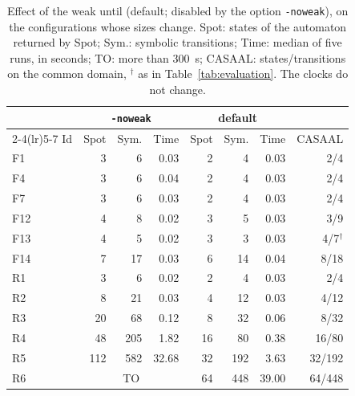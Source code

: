 \begin{table}[t]
\centering
\caption{Effect of the weak until (default; disabled by the option \texttt{-noweak}), on the configurations whose sizes change.  Spot: states of the automaton returned by Spot; Sym.: symbolic transitions; Time: median of five runs, in seconds; TO: more than 300~s; CASAAL: states/transitions on the common domain, $^\dagger$ as in Table~\ref{tab:evaluation}.  The clocks do not change.}
\label{tab:weak}
\footnotesize
\setlength{\tabcolsep}{3pt}
\begin{tabular}{@{}lrrrrrrr@{}}
\toprule
 & \multicolumn{3}{c}{\texttt{-noweak}} & \multicolumn{3}{c}{default} & \\
\cmidrule(lr){2-4}\cmidrule(lr){5-7}
Id & Spot & Sym. & Time & Spot & Sym. & Time & CASAAL\\
\midrule
F1 & 3 & 6 & 0.03 & 2 & 4 & 0.03 & 2/4\\
F4 & 3 & 6 & 0.04 & 2 & 4 & 0.03 & 2/4\\
F7 & 3 & 6 & 0.03 & 2 & 4 & 0.03 & 2/4\\
F12 & 4 & 8 & 0.02 & 3 & 5 & 0.03 & 3/9\\
F13 & 4 & 5 & 0.02 & 3 & 3 & 0.03 & 4/7$^\dagger$\\
F14 & 7 & 17 & 0.03 & 6 & 14 & 0.04 & 8/18\\
R1 & 3 & 6 & 0.02 & 2 & 4 & 0.03 & 2/4\\
R2 & 8 & 21 & 0.03 & 4 & 12 & 0.03 & 4/12\\
R3 & 20 & 68 & 0.12 & 8 & 32 & 0.06 & 8/32\\
R4 & 48 & 205 & 1.82 & 16 & 80 & 0.38 & 16/80\\
R5 & 112 & 582 & 32.68 & 32 & 192 & 3.63 & 32/192\\
R6 & \multicolumn{3}{c}{TO} & 64 & 448 & 39.00 & 64/448\\
\bottomrule
\end{tabular}
\end{table}
